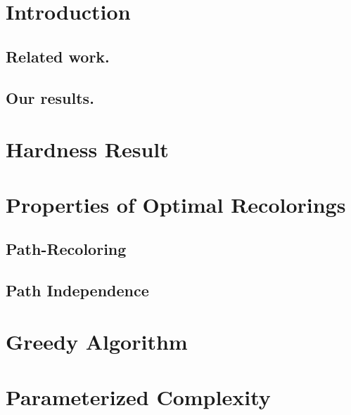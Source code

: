 \section{Introduction}

	\subsection*{Related work.}
	
	\subsection*{Our results.}
	
\section{Hardness Result}


\section{Properties of Optimal Recolorings}

	\subsection{Path-Recoloring}

	\subsection{Path Independence}


\section{Greedy Algorithm}

\section{Parameterized Complexity}
